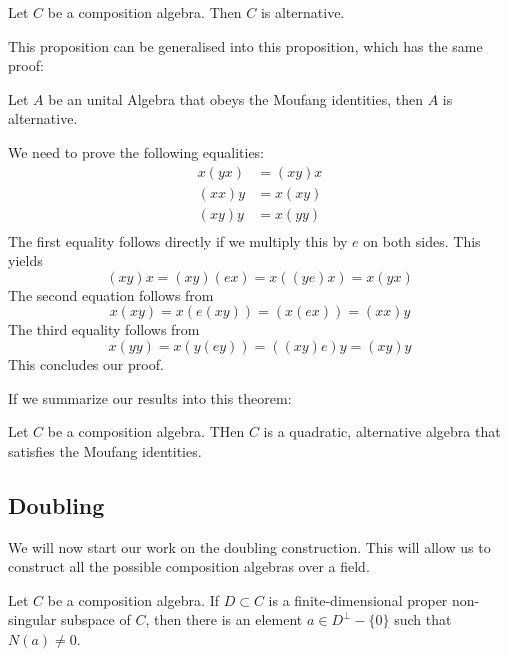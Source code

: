 \documentclass[../Thesis.tex]{subfiles}
\begin{document}
\begin{prop}
Let $C$ be a composition algebra. Then $C$ is alternative.
\end{prop}
This proposition can be generalised into this proposition, which has the same proof:
\begin{prop}
Let $A$ be an unital Algebra that obeys the Moufang identities, then $A$ is alternative.
\end{prop}

\begin{myproof}
We need to prove the following equalities:
\begin{align}
x(yx) &= (xy)x \\
(xx)y &= x(xy) \\
(xy)y &= x(yy) \\
\end{align}
The first equality follows directly if we multiply this by $e$ on both sides. This yields
\begin{equation}
(xy)x = (xy)(ex) = x((ye)x) = x(yx)
\end{equation}
The second equation follows from
\begin{equation}
x(xy) = x(e(xy)) = (x(ex)) = (xx) y
\end{equation}
The third equality follows from 
\begin{equation}
x(yy) = x(y(ey)) = ((xy)e)y = (xy)y
\end{equation}
This concludes our proof.
\end{myproof}
If we summarize our results into this theorem:
\begin{theorem}
Let $C$ be a composition algebra. THen $C$ is a quadratic, alternative algebra that satisfies the Moufang identities.
\end{theorem}
\subsection{Doubling}
We will now start our work on the doubling construction. This will allow us to construct all the possible composition algebras over a field.
\begin{lemma}
Let $C$ be a composition algebra. If $D \subset C$ is a finite-dimensional proper non-singular subspace of $C$, then there is an element $a \in D^\perp -  \{ 0 \}$ such that $N(a) \neq 0$.
\end{lemma}
\end{document}
